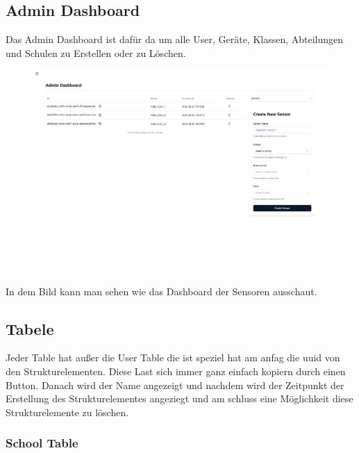 \begin{inhalt}
\newpage

\section{Admin Dashboard}

Das Admin Dashboard ist dafür da um alle User, Geräte, Klassen, Abteilungen und Schulen zu Erstellen oder zu Löschen. 

\begin{figure}[!htb]
\centering
\includegraphics[width=1\textwidth]{files/Thomas/pics/Website/admin/devices/devices-screen.png}
\caption[Bildbezeichnung für Abbildungsverzeichnis]{}
\label{fig:gehaeuse_internet_bild}
\end{figure}

\clearpage


In dem Bild kann man sehen wie das Dashboard der Sensoren ausschaut.

\subsection{Tabele}

Jeder Table hat außer die User Table die ist speziel hat am anfag die uuid von den Strukturelementen. Diese Last sich immer ganz einfach kopiern durch einen Button. Danach wird der Name angezeigt und nachdem wird der Zeitpunkt der Erstellung des Strukturelementes angeziegt und am schluss eine Möglichkeit diese Strukturelemente zu löschen. 



\subsubsection{School Table}


\end{inhalt}
